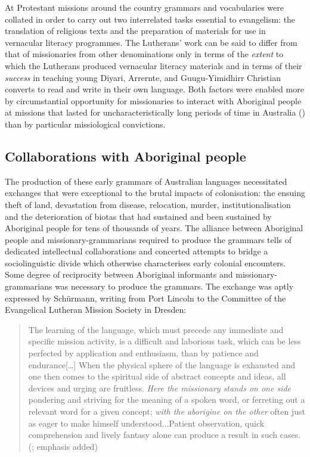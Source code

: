 At Protestant missions around the country grammars and vocabularies were collated in order to carry out two interrelated tasks essential to evangelism: the translation of religious texts and the preparation of materials for use in vernacular literacy programmes. The Lutherans’ work can be said to differ from that of missionaries from other denominations only in terms of the \textit{extent} to which the Lutherans produced vernacular literacy materials and in terms of their \textit{success} in teaching young Diyari, Arrernte, and Guugu{\hyp}Yimidhirr Christian converts to read and write in their own language. Both factors were enabled more by circumstantial opportunity for missionaries to interact with Aboriginal people at missions that lasted for uncharacteristically long periods of time in Australia () than by particular missiological convictions.

\subsection{Collaborations with Aboriginal people}
\label{sec:key:1.1.3}

The production of these early grammars of Australian languages necessitated exchanges that were exceptional to the brutal impacts of colonisation: the ensuing theft of land, devastation from disease, relocation, murder, institutionalisation and the deterioration of biotas that had sustained and been sustained by Aboriginal people for tens of thousands of years.  The alliance between Aboriginal people and missionary-grammarians required to produce the grammars tells of dedicated intellectual collaborations and concerted attempts to bridge a sociolinguistic divide which otherwise characterises early colonial encounters. Some degree of reciprocity between Aboriginal informants and missionary-grammarians was necessary to produce the grammars. The exchange was aptly expressed by Schürmann, writing from Port Lincoln to the Committee of the Evangelical Lutheran Mission Society in Dresden:
\begin{quote}
    The learning of the language, which must precede any immediate and specific mission activity, is a difficult and laborious task, which can be less perfected by application and enthusiasm, than by patience and endurance[…] When the physical sphere of the language is exhausted and one then comes to the spiritual side of abstract concepts and ideas, all devices and urging are fruitless. \textit{Here the missionary stands on one side} pondering and striving for the meaning of a spoken word, or ferreting out a relevant word for a given concept; \textit{with the aborigine on the other} often just as eager to make himself understood...Patient observation, quick comprehension and lively fantasy alone can produce a result in such cases. (\citealt{schurmann_letter_1844}; emphasis added)
\end{quote}

